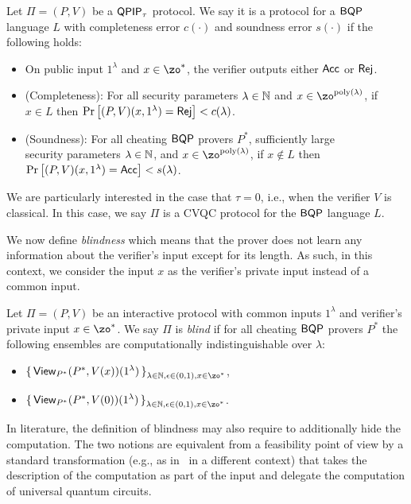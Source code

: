 \begin{definition}
    Let $\Pi=(P, V)$ be a $\operatorname{\mathsf{QPIP}}_\tau$ protocol.
    We say it is a protocol for a $\operatorname{\mathsf{BQP}}$ language $L$ with completeness error $c(\cdot)$ and soundness error $s(\cdot)$ if the following holds:
\begin{itemize}
        \item On public input $1^\lambda$ and $x\in\zo^*$, the verifier outputs either $\mathsf{Acc}$ or $\mathsf{Rej}$.
        \item (Completeness): For all security parameters $\lambda\in\mathbb{N}$ and $x\in\zo^{\poly(\lambda)}$, if $x\in L$ then
        $\Pr\left[(P, V)(x, 1^\lambda)=\mathsf{Rej}\right]<c(\lambda)$.
        \item (Soundness): For all cheating $\operatorname{\mathsf{BQP}}$ provers $P^*$, sufficiently large \\security parameters $\lambda\in\mathbb{N}$, and $x\in\zo^{\poly(\lambda)}$, if $x \notin L$ then \\$\Pr\left[(P, V)(x, 1^\lambda)=\mathsf{Acc}\right]<s(\lambda)$.
    \end{itemize}
\end{definition}

We are particularly interested in the case that $\tau = 0$, i.e., when the verifier $V$ is classical. In this case, we say $\Pi$ is a CVQC protocol for the $\operatorname{\mathsf{BQP}}$ language $L$.

We now define \emph{blindness} which means that the prover does not learn any information about the verifier's input except for its length.
As such, in this context, we consider the input $x$ as the verifier's private input instead of a common input.  

\begin{definition}[Blindness]
    Let $\Pi=(P, V)$ be an interactive protocol with common inputs $1^\lambda$ 
    and verifier's private input $x\in\zo^*$.
    We say $\Pi$ is \emph{blind} if for all cheating $\operatorname{\mathsf{BQP}}$ provers $P^*$ the following ensembles are computationally indistinguishable over $\lambda$:
    \begin{itemize}
        \item $\set{\View_{P^*}(P^*, V(x))(1^\lambda)}_{\lambda\in\bbN, \eps\in(0,1), x\in\zo^*}$,
        \item $\set{\View_{P^*}(P^*, V(0))(1^\lambda)}_{\lambda\in\bbN, \eps\in(0,1), x\in\zo^*}$.
    \end{itemize}
\end{definition}

\begin{remark} \label{rmk:blind-comp}
In literature, the definition of blindness may also require to additionally hide the computation. The two notions are equivalent from a feasibility point of view by a standard transformation (e.g., as in~\cite{GHRW14} in a different context) that takes the description of the computation as part of the input and delegate the computation of  universal quantum circuits.
\end{remark}

